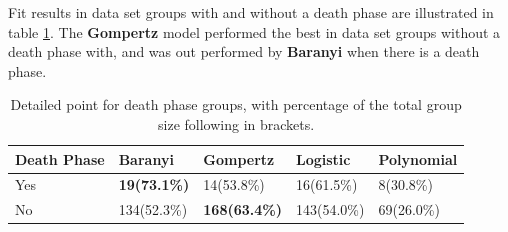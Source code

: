 \documentclass[11pt]{article}
\begin{document}
Fit results in data set groups with and without a death phase are illustrated in table \ref{tab: deathfit}. The \textbf{Gompertz} model performed the best in data set groups without a death phase with, and was out performed by \textbf{Baranyi} when there is a death phase.
\FloatBarrier
\begin{table}[!htbp]
\begin{tabularx}{\linewidth}{X X X X X}
\toprule  Death Phase & Baranyi & Gompertz & Logistic & Polynomial \\
\midrule
Yes & \textbf{19(73.1\%)} & 14(53.8\%) & 16(61.5\%) & 8(30.8\%)  \\
No & 134(52.3\%) & \textbf{168(63.4\%)} & 143(54.0\%) & 69(26.0\%)  \\
\bottomrule
\end{tabularx}
\caption{Detailed point for death phase groups, with percentage of the total group size following in brackets.}
\label{tab: deathfit}
\end{table}          
\FloatBarrier
\end{document}
